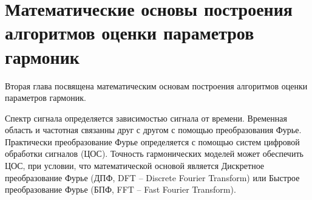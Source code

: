 %
%
%

\chapter{Математические основы построения алгоритмов оценки параметров гармоник} \label{ch:ch2}

Вторая глава посвящена математическим основам построения алгоритмов оценки параметров гармоник.

Спектр сигнала определяется зависимостью сигнала от времени. Временная область и частотная связанны друг с другом с помощью преобразования Фурье. Практически преобразование Фурье определяется с помощью систем цифровой обработки сигналов (ЦОС). Точность гармонических моделей может обеспечить ЦОС, при условии, что математической основой является Дискретное преобразование Фурье (ДПФ, DFT -- Discrete Fourier Transform) или Быстрое преобразование Фурье (БПФ, FFT -- Fast Fourier Transform). 
\cite{Time-frequency_Avramchuk_2009,Optimization_Computational_Altman2008,Building_suboptimal_Altman_2017}

